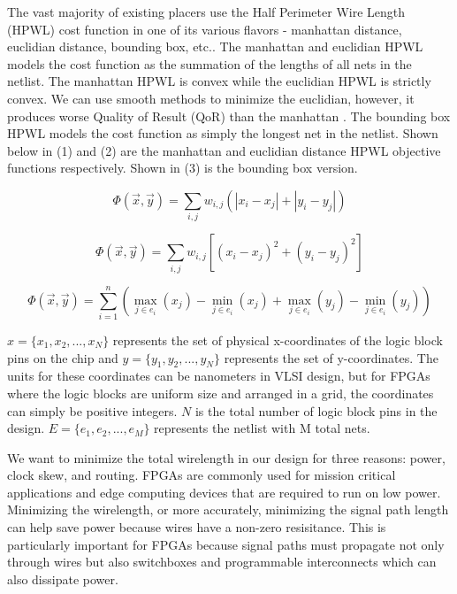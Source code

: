 \documentclass{article}
\begin{document}
    The vast majority of existing placers use the Half Perimeter Wire Length (HPWL) cost function in one of its various flavors - manhattan distance, euclidian distance, bounding box, etc..
    The manhattan and euclidian HPWL models the cost function as the summation of the lengths of all nets in the netlist. 
    The manhattan HPWL is convex while the euclidian HPWL is strictly convex.
    We can use smooth methods to minimize the euclidian, however, it produces worse Quality of Result (QoR) than the manhattan \cite{AP_2012}.
    The bounding box HPWL models the cost function as simply the longest net in the netlist.
    Shown below in (1) and (2) are the manhattan and euclidian distance HPWL objective functions respectively.
    Shown in (3) is the bounding box version.

    \begin{equation}
        \Phi(\vec{x}, \vec{y}) = \sum_{i,j} w_{i,j} \left( |x_i - x_j| + |y_i - y_j| \right)
        \label{Manhattan}
    \end{equation}

    \begin{equation}
        \Phi(\vec{x}, \vec{y}) = \sum_{i,j} w_{i,j} \left[ (x_i - x_j)^2 + (y_i - y_j)^2 \right]
        \label{Euclidian}
    \end{equation}

    \begin{equation}
        \Phi(\vec{x}, \vec{y}) = \sum_{i=1}^{n} \left( \max_{j \in e_i} (x_j) - \min_{j \in e_i} (x_j) + \max_{j \in e_i} (y_j) - \min_{j \in e_i} (y_j) \right)
        \label{BoundingBox}
    \end{equation}

    \( x = \{ x_{1}, x_{2}, ..., x_{N} \} \) represents the set of physical x-coordinates of the logic block pins on the chip and \( y = \{ y_{1}, y_{2}, ..., y_{N} \} \) represents the set of y-coordinates.
    The units for these coordinates can be nanometers in VLSI design, but for FPGAs where the logic blocks are uniform size and arranged in a grid, the coordinates can simply be positive integers.
    \( N \) is the total number of logic block pins in the design. 
    \( E = \{ e_{1}, e_{2}, ..., e_{M} \} \) represents the netlist with M total nets.

    We want to minimize the total wirelength in our design for three reasons: power, clock skew, and routing.
    FPGAs are commonly used for mission critical applications and edge computing devices that are required to run on low power.
    Minimizing the wirelength, or more accurately, minimizing the signal path length can help save power because wires have a non-zero resisitance.
    This is particularly important for FPGAs because signal paths must propagate not only through wires but also switchboxes and programmable interconnects which can also dissipate power.
    
\end{document}
